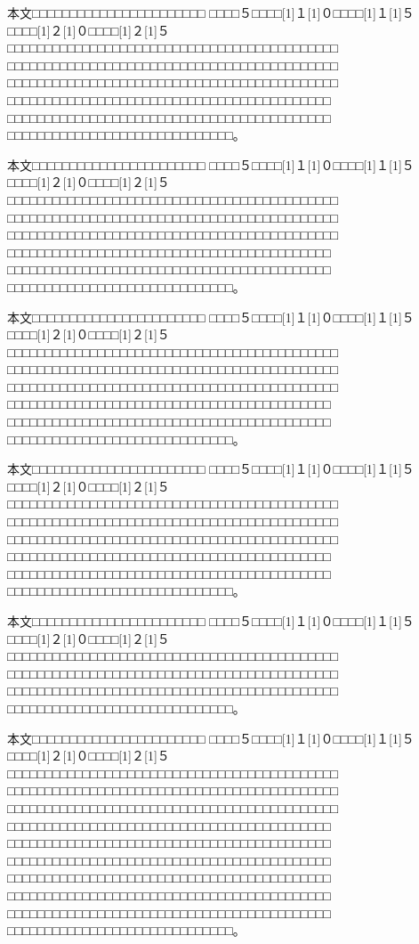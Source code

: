 \documentclass[platex,fleqn]{ieej-tec2}%
\begin{document}
{本文□□□□□□□□□□□□□□□□□□□□□□□
□□□□５□□□□\scalebox{0.5}[1]{１}\scalebox{0.5}[1]{０}□□□□\scalebox{0.5}[1]{１}\scalebox{0.5}[1]{５}□□□□\scalebox{0.5}[1]{２}\scalebox{0.5}[1]{０}□□□□\scalebox{0.5}[1]{２}\scalebox{0.5}[1]{５}□□□□□□□□□□□□□□□□□□□□□□□□□□□□□□□□□□□□□□□□□□□□
□□□□□□□□□□□□□□□□□□□□□□□□□□□□□□□□□□□□□□□□□□□□
□□□□□□□□□□□□□□□□□□□□□□□□□□□□□□□□□□□□□□□□□□□□
□□□□□□□□□□□□□□□□□□□□□□□□□□□□□□□□□□□□□□□□□□□
□□□□□□□□□□□□□□□□□□□□□□□□□□□□□□□□□□□□□□□□□□□
□□□□□□□□□□□□□□□□□□□□□□□□□□□□□□。

本文□□□□□□□□□□□□□□□□□□□□□□□
□□□□５□□□□\scalebox{0.5}[1]{１}\scalebox{0.5}[1]{０}□□□□\scalebox{0.5}[1]{１}\scalebox{0.5}[1]{５}□□□□\scalebox{0.5}[1]{２}\scalebox{0.5}[1]{０}□□□□\scalebox{0.5}[1]{２}\scalebox{0.5}[1]{５}□□□□□□□□□□□□□□□□□□□□□□□□□□□□□□□□□□□□□□□□□□□□
□□□□□□□□□□□□□□□□□□□□□□□□□□□□□□□□□□□□□□□□□□□□
□□□□□□□□□□□□□□□□□□□□□□□□□□□□□□□□□□□□□□□□□□□□
□□□□□□□□□□□□□□□□□□□□□□□□□□□□□□□□□□□□□□□□□□□
□□□□□□□□□□□□□□□□□□□□□□□□□□□□□□□□□□□□□□□□□□□
□□□□□□□□□□□□□□□□□□□□□□□□□□□□□□。

本文□□□□□□□□□□□□□□□□□□□□□□□
□□□□５□□□□\scalebox{0.5}[1]{１}\scalebox{0.5}[1]{０}□□□□\scalebox{0.5}[1]{１}\scalebox{0.5}[1]{５}□□□□\scalebox{0.5}[1]{２}\scalebox{0.5}[1]{０}□□□□\scalebox{0.5}[1]{２}\scalebox{0.5}[1]{５}□□□□□□□□□□□□□□□□□□□□□□□□□□□□□□□□□□□□□□□□□□□□
□□□□□□□□□□□□□□□□□□□□□□□□□□□□□□□□□□□□□□□□□□□□
□□□□□□□□□□□□□□□□□□□□□□□□□□□□□□□□□□□□□□□□□□□□
□□□□□□□□□□□□□□□□□□□□□□□□□□□□□□□□□□□□□□□□□□□
□□□□□□□□□□□□□□□□□□□□□□□□□□□□□□□□□□□□□□□□□□□
□□□□□□□□□□□□□□□□□□□□□□□□□□□□□□。

本文□□□□□□□□□□□□□□□□□□□□□□□
□□□□５□□□□\scalebox{0.5}[1]{１}\scalebox{0.5}[1]{０}□□□□\scalebox{0.5}[1]{１}\scalebox{0.5}[1]{５}□□□□\scalebox{0.5}[1]{２}\scalebox{0.5}[1]{０}□□□□\scalebox{0.5}[1]{２}\scalebox{0.5}[1]{５}□□□□□□□□□□□□□□□□□□□□□□□□□□□□□□□□□□□□□□□□□□□□
□□□□□□□□□□□□□□□□□□□□□□□□□□□□□□□□□□□□□□□□□□□□
□□□□□□□□□□□□□□□□□□□□□□□□□□□□□□□□□□□□□□□□□□□□
□□□□□□□□□□□□□□□□□□□□□□□□□□□□□□□□□□□□□□□□□□□
□□□□□□□□□□□□□□□□□□□□□□□□□□□□□□□□□□□□□□□□□□□
□□□□□□□□□□□□□□□□□□□□□□□□□□□□□□。

本文□□□□□□□□□□□□□□□□□□□□□□□
□□□□５□□□□\scalebox{0.5}[1]{１}\scalebox{0.5}[1]{０}□□□□\scalebox{0.5}[1]{１}\scalebox{0.5}[1]{５}□□□□\scalebox{0.5}[1]{２}\scalebox{0.5}[1]{０}□□□□\scalebox{0.5}[1]{２}\scalebox{0.5}[1]{５}□□□□□□□□□□□□□□□□□□□□□□□□□□□□□□□□□□□□□□□□□□□□
□□□□□□□□□□□□□□□□□□□□□□□□□□□□□□□□□□□□□□□□□□□□
□□□□□□□□□□□□□□□□□□□□□□□□□□□□□□□□□□□□□□□□□□□□
□□□□□□□□□□□□□□□□□□□□□□□□□□□□□□。

本文□□□□□□□□□□□□□□□□□□□□□□□
□□□□５□□□□\scalebox{0.5}[1]{１}\scalebox{0.5}[1]{０}□□□□\scalebox{0.5}[1]{１}\scalebox{0.5}[1]{５}□□□□\scalebox{0.5}[1]{２}\scalebox{0.5}[1]{０}□□□□\scalebox{0.5}[1]{２}\scalebox{0.5}[1]{５}□□□□□□□□□□□□□□□□□□□□□□□□□□□□□□□□□□□□□□□□□□□□
□□□□□□□□□□□□□□□□□□□□□□□□□□□□□□□□□□□□□□□□□□□□
□□□□□□□□□□□□□□□□□□□□□□□□□□□□□□□□□□□□□□□□□□□□
□□□□□□□□□□□□□□□□□□□□□□□□□□□□□□□□□□□□□□□□□□□
□□□□□□□□□□□□□□□□□□□□□□□□□□□□□□□□□□□□□□□□□□□
□□□□□□□□□□□□□□□□□□□□□□□□□□□□□□□□□□□□□□□□□□□
□□□□□□□□□□□□□□□□□□□□□□□□□□□□□□□□□□□□□□□□□□□
□□□□□□□□□□□□□□□□□□□□□□□□□□□□□□□□□□□□□□□□□□□
□□□□□□□□□□□□□□□□□□□□□□□□□□□□□□□□□□□□□□□□□□□
□□□□□□□□□□□□□□□□□□□□□□□□□□□□□□。

}
\end{document}
